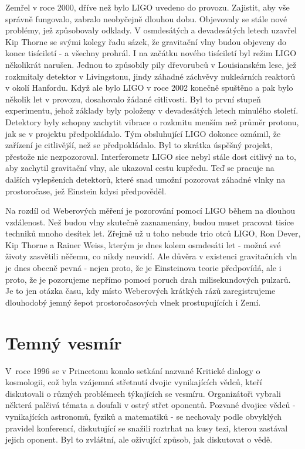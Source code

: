   Zemřel v roce 2000, dříve než bylo LIGO uvedeno do provozu. Zajistit, aby vše správně fungovalo,
  zabralo neobyčejně dlouhou dobu. Objevovaly se stále nové problémy, jež způsobovaly odklady. V
  osmdesátých a devadesátých letech uzavřel Kip Thorne se svými kolegy řadu sázek, že gravitační
  vlny budou objeveny do konce tisíciletí - a všechny prohrál. I na začátku nového tisíciletí byl
  režim LIGO několikrát narušen. Jednou to způsobily pily dřevorubců v Louisianském lese, jež
  rozkmitaly detektor v Livingstonu, jindy záhadné záchvěvy nukleárních reaktorů v okolí Hanfordu.
  Když ale bylo LIGO v roce 2002 konečně spuštěno a pak bylo několik let v provozu, dosahovalo
  žádané citlivosti. Byl to první stupeň experimentu, jehož základy byly položeny v devadesátých
  letech minulého století. Detektory byly schopny zachytit vibrace o rozkmitu menším než průměr
  protonu, jak se v projektu předpokládalo. Tým obsluhující LIGO dokonce oznámil, že zařízení je
  citlivější, než se předpokládalo. Byl to zkrátka úspěšný projekt, přestože nic nezpozoroval.
  Interferometr LIGO sice nebyl stále dost citlivý na to, aby zachytil gravitační vlny, ale ukazoval
  cestu kupředu. Teď se pracuje na dalších vylepšeních detektorů, které snad umožní pozorovat
  záhadné vlnky na prostoročase, jež Einstein kdysi předpověděl. 
  
  Na rozdíl od Weberových měření je pozorování pomocí LIGO během na dlouhou vzdálenost. Než budou
  vlny skutečně zaznamenány, budou muset pracovat tisíce techniků mnoho desítek let. Zřejmě už u
  toho nebude trio otců LIGO, Ron Dever, Kip Thorne a Rainer Weiss, kterým je dnes kolem osmdesáti
  let - možná své životy zasvětili něčemu, co nikdy neuvidí. Ale důvěra v existenci gravitačních vln
  je dnes obecně pevná - nejen proto, že je Einsteinova teorie předpovídá, ale i proto, že je
  pozorujeme nepřímo pomocí poruch drah milisekundových pulzarů. Je to jen otázka času, kdy místo
  Weberových krátkých rázů zaregistrujeme dlouhodobý jemný šepot prostoročasových vlnek
  prostupujících i Zemí.

\section{Temný vesmír}\label{kulIchIIIsecXII}
  V roce 1996 se v Princetonu konalo setkání nazvané Kritické dialogy o kosmologii, což byla
  vzájemná střetnutí dvojic vynikajících vědců, kteří diskutovali o různých problémech týkajících se
  vesmíru. Organizátoři vybrali některá palčivá témata a doufali v ostrý střet oponentů. Pozvané
  dvojice vědců - vynikajících astronomů, fyziků a matematiků - se nechovaly podle obvyklých
  pravidel konferencí, diskutující se snažili roztrhat na kusy tezi, kterou zastával jejich oponent.
  Byl to zvláštní, ale oživující způsob, jak diskutovat o vědě. 
  
